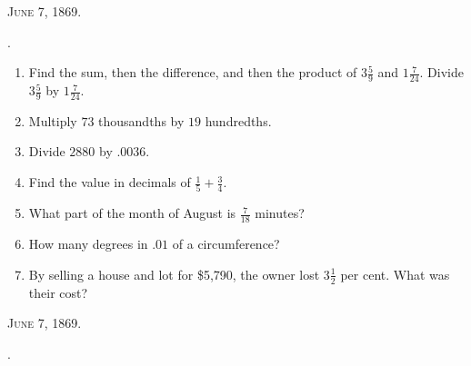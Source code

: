 \documentclass[12pt]{article}
\begin{document}
\hspace{0.5cm}\textsc{\small{June 7, 1869}}.

\newpage

\begin{center}
    .
\end{center}

\begin{enumerate}[itemsep=18pt] %
    \item Find the sum, then the difference, and then the product of $3\frac{5}{9}$ and $1\frac{7}{24}$. Divide $3\frac{5}{9}$ by $1\frac{7}{24}$.

    \item Multiply $73$ thousandths by $19$ hundredths.
    
    \item Divide $2880$ by $.0036$.
    
    \item Find the value in decimals of $\frac{1}{5} + \frac{3}{4}$.
    
    \item What part of the month of August is $\frac{7}{18}$ minutes?
    
    \item How many degrees in $.01$ of a circumference?
    
    \item By selling a house and lot for \$5{,}790, the owner lost $3\frac{1}{2}$ per cent. What was their cost?
    
\end{enumerate}

\hspace{0.5cm}\textsc{\small{June 7, 1869}}.

\newpage

\begin{center}
    .
\end{center}
\end{document}
